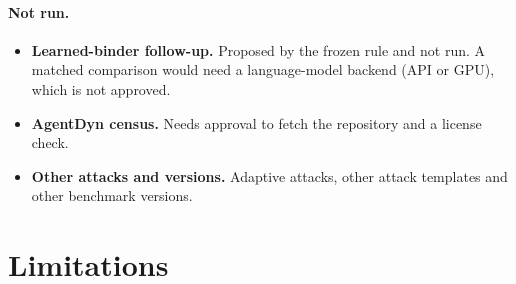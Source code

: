 \documentclass{article}
\begin{document}
\paragraph{Not run.}
\begin{itemize}
\item \textbf{Learned-binder follow-up.} Proposed by the frozen rule and not
run. A matched comparison would need a language-model backend (API or GPU),
which is not approved.
\item \textbf{AgentDyn census.} Needs approval to fetch the repository and a
license check.
\item \textbf{Other attacks and versions.} Adaptive attacks, other attack
templates and other benchmark versions.
\end{itemize}

\section{Limitations}
\label{sec:limits}
\end{document}
